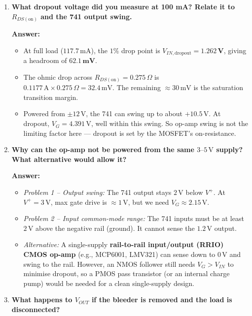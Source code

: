 \documentclass[11pt,a4paper]{article}
\begin{document}
\begin{enumerate}[label=\textbf{Q\arabic*.}, leftmargin=2.0em, itemsep=0.8em]
    \item \textbf{What dropout voltage did you measure at 100 mA? Relate it to $R_{DS(\text{on})}$ and the 741 output swing.}

    \textbf{Answer:}
    \begin{itemize}[leftmargin=1.2em, itemsep=0.1em]
        \item At full load ($117.7\,\text{mA}$), the $1\%$ drop point is $V_{IN,\text{dropout}} = \mathbf{1.262\,\text{V}}$, giving a headroom of $\mathbf{62.1\,\text{mV}}$.
        \item The ohmic drop across $R_{DS(\text{on})} = 0.275\,\Omega$ is $0.1177\,\text{A} \times 0.275\,\Omega = 32.4\,\text{mV}$. The remaining $\approx 30\,\text{mV}$ is the saturation transition margin.
        \item Powered from $\pm 12\,\text{V}$, the 741 can swing up to about $+10.5\,\text{V}$. At dropout, $V_G = 4.391\,\text{V}$, well within this swing. So op-amp swing is not the limiting factor here --- dropout is set by the MOSFET's on-resistance.
    \end{itemize}

    \item \textbf{Why can the op-amp not be powered from the same $3\text{--}5\,\text{V}$ supply? What alternative would allow it?}

    \textbf{Answer:}
    \begin{itemize}[leftmargin=1.2em, itemsep=0.1em]
        \item \textit{Problem 1 -- Output swing:} The 741 output stays $2\,\text{V}$ below $V^+$. At $V^+ = 3\,\text{V}$, max gate drive is $\approx 1\,\text{V}$, but we need $V_G \approx 2.15\,\text{V}$.
        \item \textit{Problem 2 -- Input common-mode range:} The 741 inputs must be at least $2\,\text{V}$ above the negative rail (ground). It cannot sense the $1.2\,\text{V}$ output.
        \item \textit{Alternative:} A single-supply \textbf{rail-to-rail input/output (RRIO) CMOS op-amp} (e.g., MCP6001, LMV321) can sense down to $0\,\text{V}$ and swing to the rail. However, an NMOS follower still needs $V_G > V_{IN}$ to minimise dropout, so a PMOS pass transistor (or an internal charge pump) would be needed for a clean single-supply design.
    \end{itemize}

    \item \textbf{What happens to $V_{OUT}$ if the bleeder is removed and the load is disconnected?}


\end{enumerate}
\end{document}
